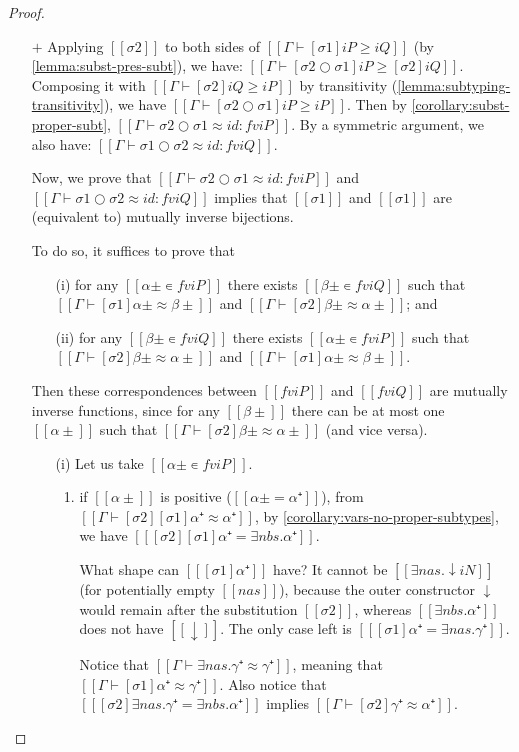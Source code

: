 \begin{proof}
  \hfill
  \begin{itemize}
  \item[$+$]
    Applying $[[σ2]]$ to both sides of
    $[[Γ ⊢ [σ1] iP ≥ iQ]]$ (by \cref{lemma:subst-pres-subt}),
    we have: $[[Γ ⊢ [σ2 ○ σ1] iP ≥ [σ2]iQ]]$.
    Composing it with $[[Γ ⊢ [σ2] iQ ≥ iP]]$ by transitivity 
    (\cref{lemma:subtyping-transitivity}),
    we have $[[Γ ⊢ [σ2 ○ σ1] iP ≥ iP]]$.
    Then by \cref{corollary:subst-proper-subt},
    $[[Γ ⊢ σ2 ○ σ1 ≈ id :  fv iP]]$.
    By a symmetric argument, we also have:
    $[[Γ ⊢ σ1 ○ σ2 ≈ id :  fv iQ]]$.

    Now, we prove that
    $[[Γ ⊢ σ2 ○ σ1 ≈ id :  fv iP]]$ and
    $[[Γ ⊢ σ1 ○ σ2 ≈ id :  fv iQ]]$
    implies that $[[σ1]]$ and $[[σ1]]$
    are (equivalent to) mutually inverse bijections.

    To do so, it suffices to prove that
    \begin{enumerate}
    \item[(i)] for any $[[α± ∊ fv iP]]$ there exists $[[β± ∊ fv iQ]]$
        such that $[[ Γ ⊢ [σ1] α± ≈ β± ]]$ and
        $[[ Γ ⊢ [σ2] β± ≈ α± ]]$; and
    \item[(ii)] for any $[[β± ∊ fv iQ]]$ there exists $[[α± ∊ fv iP]]$
        such that $[[ Γ ⊢ [σ2] β± ≈ α± ]]$ and
        $[[ Γ ⊢ [σ1] α± ≈ β± ]]$.
    \end{enumerate}
    Then these correspondences between $[[fv iP]]$ and
    $[[fv iQ]]$ are mutually inverse functions,
    since for any $[[β±]]$ there can be at most one $[[α±]]$
    such that $[[ Γ ⊢ [σ2] β± ≈ α± ]]$ (and vice versa).

    \begin{enumerate}
    \item[(i)] Let us take $[[α± ∊ fv iP]]$.
      \begin{enumerate}
      \item if $[[α±]]$ is positive ($[[α± = α⁺]]$),
        from $[[ Γ ⊢ [σ2][σ1]α⁺ ≈ α⁺ ]]$,
        by \cref{corollary:vars-no-proper-subtypes},
        we have
        $[[ [σ2][σ1]α⁺ = ∃nbs.α⁺ ]]$.

        What shape can $[[ [σ1]α⁺ ]]$ have? It cannot be $[[∃nas.↓iN]]$ (for
        potentially empty $[[nas]]$), because the outer constructor $\downarrow$
        would remain after the substitution $[[σ2]]$, whereas $[[∃nbs.α⁺]]$ does
        not have $[[↓]]$. The only case left is $[[ [σ1]α⁺ = ∃nas.γ⁺ ]]$.

        Notice that $[[Γ ⊢ ∃nas.γ⁺ ≈ γ⁺]]$, meaning that $[[Γ ⊢ [σ1]α⁺ ≈ γ⁺]]$.
        Also notice that $[[ [σ2]∃nas.γ⁺ = ∃nbs.α⁺ ]]$ implies
        $[[Γ ⊢ [σ2]γ⁺ ≈ α⁺]]$.


\end{enumerate}
\end{enumerate}
\end{itemize}
\end{proof}
